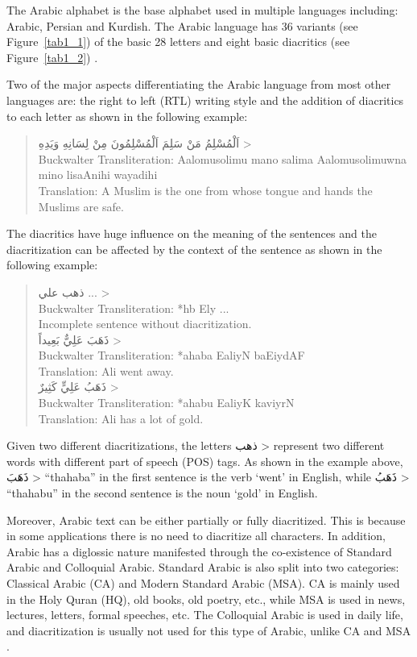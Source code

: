 \documentclass[conference]{IEEEtran}
\begin{document}
The Arabic alphabet is the base alphabet used in multiple languages including: Arabic, Persian and Kurdish. The Arabic language has 36 variants (see Figure~\ref{tab1_1}) of the basic 28 letters and eight basic diacritics (see Figure~\ref{tab1_2}) \cite{abandah2015automatic}.

Two of the major aspects differentiating the Arabic language from most other languages are: the right to left (RTL) writing style and the addition of diacritics to each letter as shown in the following example:
\begin{quote}
\centering
{}\<
اَلْمُسْلِمُ مَنْ سَلِمَ اَلْمُسْلِمُونَ مِنْ لِسَانِهِ وَيَدِهِ
> \\
Buckwalter Transliteration: Aalomusolimu mano salima Aalomusolimuwna mino lisaAnihi wayadihi \\
Translation: A Muslim is the one from whose tongue
and hands the Muslims are safe.
\end{quote}

The diacritics have huge influence on the meaning of the sentences and the diacritization can be affected by the context of the sentence as shown in the following example:
\begin{quote}
\centering
\<
ذهب علي ...
> \\
Buckwalter Transliteration: *hb Ely ... \\
Incomplete sentence without diacritization. \\
\<
ذَهَبَ عَلِيٌّ بَعِيداً
>\\
Buckwalter Transliteration: *ahaba EaliyN baEiydAF \\
Translation: Ali went away. \\
\<
ذَهَبُ عَلِيٍّ كَثِيرٌ
> \\
Buckwalter Transliteration: *ahabu EaliyK kaviyrN \\
Translation: Ali has a lot of gold.
\end{quote}
Given two different diacritizations, the letters
\<
ذهب 
>
represent two different words with different part of speech (POS) tags. As shown in the example above,
\<
ذَهَبَ 
>
``thahaba'' in the first sentence is the verb `went' in English, while
\<
ذَهَبُ
>
``thahabu'' in the second sentence is the noun `gold' in English.

Moreover, Arabic text can be either partially or fully diacritized. This is because in some applications there is no need to diacritize all characters. In addition, Arabic has a diglossic nature manifested through the co-existence of Standard Arabic and Colloquial Arabic. Standard Arabic is also split into two categories: Classical Arabic (CA) and Modern Standard Arabic (MSA). CA is mainly used in the Holy Quran (HQ), old books, old poetry, etc., while MSA is used in news, lectures, letters, formal speeches, etc. The Colloquial Arabic is used in daily life, and diacritization is usually not used for this type of Arabic, unlike CA and MSA \cite{habash2010introduction}.
\end{document}
